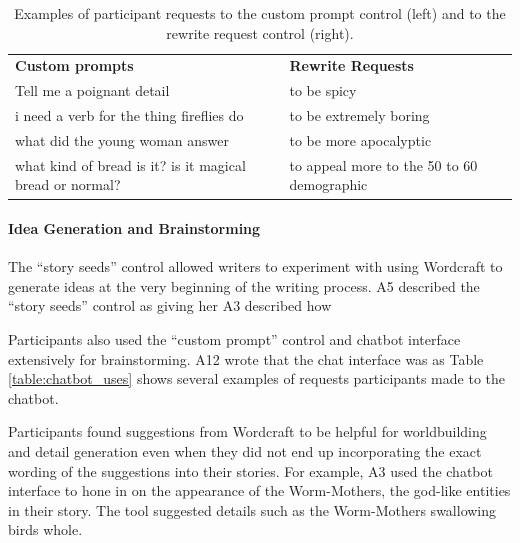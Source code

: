 \begin{table}[t]
  \centering
  \small
  \caption{Examples of participant requests to the custom prompt control (left) and to the rewrite request control (right).}
  \label{table:control_uses}
    \begin{tabular}{p{2.7in}|p{3in}}
    \hline
    \textbf{Custom prompts} & \textbf{Rewrite Requests} \\
    Tell me a poignant detail & to be spicy \\
    i need a verb for the thing fireflies do  & to be extremely boring \\
    what did the young woman answer  & to be more apocalyptic \\
    what kind of bread is it? is it magical bread or normal?  & to appeal more to the 50 to 60 demographic \\
    \hline
    \end{tabular}%
\end{table}%


\paragraph{Idea Generation and Brainstorming}
The ``story seeds'' control allowed writers to experiment with using Wordcraft to generate ideas at the very beginning of the writing process.
A5 described the ``story seeds'' control as giving her 
A3 described how 

Participants also used the ``custom prompt'' control and chatbot interface extensively for brainstorming.
A12 wrote that the chat interface was as 
Table \ref{table:chatbot_uses} shows several examples of requests participants made to the chatbot.

Participants found suggestions from Wordcraft to be helpful for worldbuilding and detail generation even when they did not end up incorporating the exact wording of the suggestions into their stories.
For example, A3 used the chatbot interface to hone in on the appearance of the Worm-Mothers, the god-like entities in their story.
The tool suggested details such as the Worm-Mothers swallowing birds whole.



